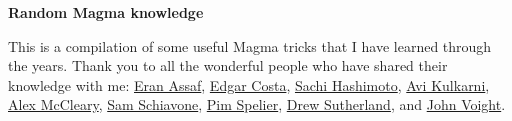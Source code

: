 \documentclass[12pt]{article}
\begin{document}
\begin{center}
\begin{Large}
    \textbf{Random \textsf{Magma} knowledge}\\
\end{Large}
\end{center}

This is a compilation of some useful \textsf{Magma} tricks that I have learned through the years. Thank you to all the wonderful people who have shared their knowledge with me:
\href{https://math.dartmouth.edu/~eassaf/}{Eran Assaf},
\href{https://math.mit.edu/~edgarc/}{Edgar Costa},
\href{https://sachihashimoto.github.io}{Sachi Hashimoto},
\href{https://math.dartmouth.edu/~akulkarn/}{Avi Kulkarni},
\href{https://www.alexmccleary.org}{Alex McCleary},
\href{https://math.mit.edu/~sschiavo/}{Sam Schiavone},
\href{https://sites.google.com/view/pim-spelier/home}{Pim Spelier},
\href{https://math.mit.edu/~drew/}{Drew Sutherland}, and
\href{https://jvoight.github.io}{John Voight}.
\end{document}
